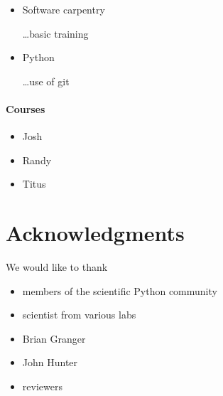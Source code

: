 \documentclass[ChapterTOCs,krantz2]{krantz} %
\begin{document}
\begin{itemize}

\item Software carpentry

\ldots basic training

\item Python

\ldots use of git

\end{itemize}

\paragraph{ {\bf Courses}}

\begin{itemize}

\item Josh

\item Randy

\item Titus

\end{itemize}


\section*{Acknowledgments}
We would like to thank
\begin{itemize}
\item members of the scientific Python community
\item scientist from various labs
\item Brian Granger
\item John Hunter
\item reviewers
\end{itemize}



\end{document}
